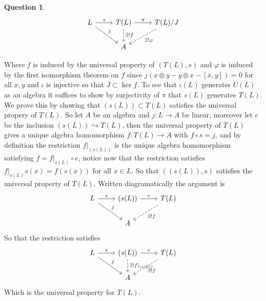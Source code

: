 \documentclass[10.5pt]{article}
\theoremstyle{definition}
\newtheorem{pb}{Question}
\numberwithin{example}{subsection}
\numberwithin{proposition}{subsection}
\begin{document}
\begin{pb}
        \begin{equation}\begin{tikzcd}
            L \arrow[dr,"j"] \arrow[r,"s"] &T(L) \arrow[d,dashed,"\exists ! f"] \arrow[r,"\pi"] &T(L)/J \arrow[dl,dashed,"\exists! \varphi"] \\
            &A
        \end{tikzcd}\end{equation}

        Where \(f\) is induced by the universal property of \((T(L),s)\) and \(\varphi\) is induced by the first isomorphism theorem on \(f\) since \(j(x\otimes y - y\otimes x - [x,y]) = 0\) for all \(x,y\) and \(\iota\) is injective so that \(J \subset \ker f\). To see that \(\iota(L)\) generates \(U(L)\) as an algebra it suffices to show by surjectivity of \(\pi\) that \(s(L)\) generates \(T(L)\). We prove this by showing that \((s(L)) \subset T(L)\) satisfies the universal propery of \(T(L)\). So let \(A\) be an algebra and \(j: L \to A\) be linear, moreover let \(e\) be the inclusion \((s(L)) \hookrightarrow T(L)\), then the universal property of \(T(L)\) gives a unique algebra homomorphism \(f: T(L) \to A\) with \(f\circ s = j\), and by definition the restriction \(f\vert_{(s(L))}\) is the unique algebra homomorphism satisfying \(f = f\vert_{s(L)} \circ e\), notice now that the restriction satisfies \(f\vert_{s(L)}s(x) = f(s(x))\) for all \(x \in L\). So that \(((s(L)),s)\) satisfies the universal property of \(T(L)\). Written diagramatically the argument is
        \begin{equation}\begin{tikzcd}
            L \arrow[dr,"j"] \arrow[r,"s"] &(s(L)) \arrow[r,"e"] &T(L) \arrow[dl,dashed,"\exists ! f"] \\ &A
        \end{tikzcd}\end{equation}
        So that the restriction satisfies
        \begin{equation}\begin{tikzcd}
            L \arrow[dr,"j"] \arrow[r,"s"] &(s(L)) \arrow[d,dashed,"\exists! f\vert_{(s(L))}"] \arrow[r,"e"] &T(L) \arrow[dl,dashed, "\exists! f"] \\ &A
        \end{tikzcd}\end{equation}
        Which is the universal property for \(T(L)\).


\end{pb}
\end{document}
